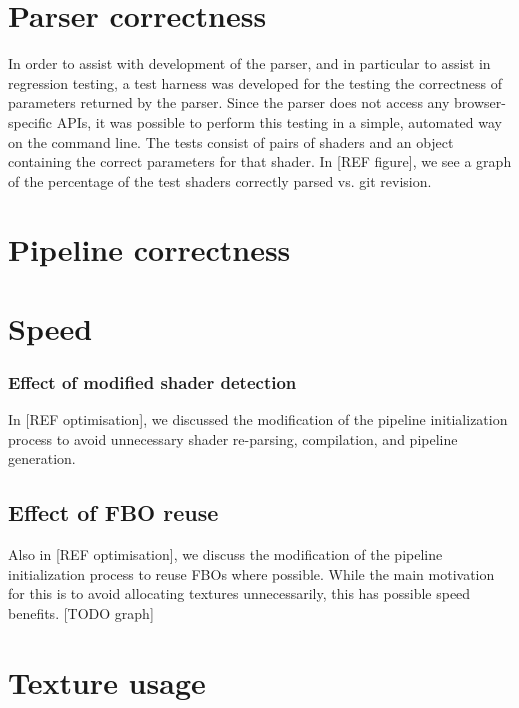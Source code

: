 \documentclass[12pt,twoside,notitlepage]{report}
\begin{document}
\section{Parser correctness}
In order to assist with development of the parser, and in particular to assist in regression testing, a test harness was developed for the testing the correctness of parameters returned by the parser. Since the parser does not access any browser-specific APIs, it was possible to perform this testing in a simple, automated way on the command line. The tests consist of pairs of shaders and an object containing the correct parameters for that shader. In [REF figure], we see a graph of the percentage of the test shaders correctly parsed vs. git revision.


\section{Pipeline correctness}

\section{Speed}
\subsubsection{Effect of modified shader detection}
In [REF optimisation], we discussed the modification of the pipeline initialization process to avoid unnecessary shader re-parsing, compilation, and pipeline generation. 

\subsection{Effect of FBO reuse}
Also in [REF optimisation], we discuss the modification of the pipeline initialization process to reuse FBOs where possible. While the main motivation for this is to avoid allocating textures unnecessarily, this has possible speed benefits. [TODO graph]

\section{Texture usage}
\end{document}
